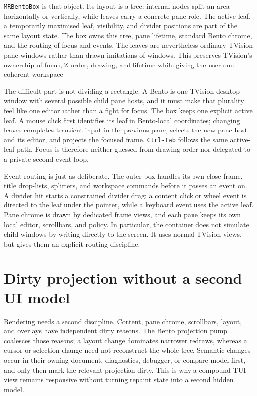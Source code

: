 \documentclass[a4paper,10pt,twoside,openany]{book}
\begin{document}
\texttt{MRBentoBox} is that object. Its layout is a tree: internal nodes split
an area horizontally or vertically, while leaves carry a concrete pane role.
The active leaf, a temporarily maximised leaf, visibility, and divider
positions are part of the same layout state. The box owns this tree, pane
lifetime, standard Bento chrome, and the routing of focus and events. The
leaves are nevertheless ordinary TVision pane windows rather than drawn
imitations of windows. This preserves TVision's ownership of focus, Z order,
drawing, and lifetime while giving the user one coherent workspace.

The difficult part is not dividing a rectangle. A Bento is one TVision desktop
window with several possible child pane hosts, and it must make that plurality
feel like one editor rather than a fight for focus. The box keeps one explicit
active leaf. A mouse click first identifies its leaf in Bento-local
coordinates; changing leaves completes transient input in the previous pane,
selects the new pane host and its editor, and projects the focused frame.
\texttt{Ctrl-Tab} follows the same active-leaf path. Focus is therefore neither
guessed from drawing order nor delegated to a private second event loop.

Event routing is just as deliberate. The outer box handles its own close
frame, title drop-lists, splitters, and workspace commands before it passes an
event on. A divider hit starts a constrained divider drag; a content click or
wheel event is directed to the leaf under the pointer, while a keyboard event
uses the active leaf. Pane chrome is drawn by dedicated frame views, and each
pane keeps its own local editor, scrollbars, and policy. In particular, the
container does not simulate child windows by writing directly to the screen.
It uses normal TVision views, but gives them an explicit routing discipline.

\section{Dirty projection without a second UI model}

Rendering needs a second discipline. Content, pane chrome, scrollbars, layout,
and overlays have independent dirty reasons. The Bento projection pump
coalesces those reasons; a layout change dominates narrower redraws, whereas a
cursor or selection change need not reconstruct the whole tree. Semantic
changes occur in their owning document, diagnostics, debugger, or compare
model first, and only then mark the relevant projection dirty. This is why a
compound TUI view remains responsive without turning repaint state into a
second hidden model.
\end{document}
